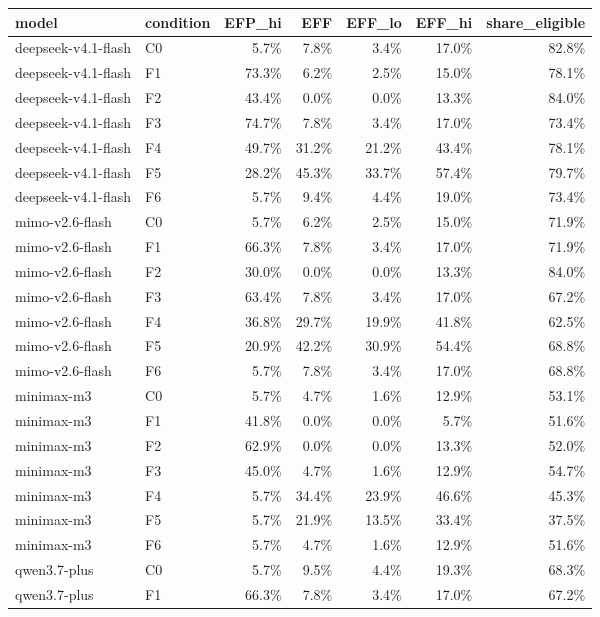 \begin{tabular}{llrrrrr}
\toprule
model & condition & EFP\_hi & EFF & EFF\_lo & EFF\_hi & share\_eligible \\
\midrule
deepseek-v4.1-flash & C0 & 5.7\% & 7.8\% & 3.4\% & 17.0\% & 82.8\% \\
deepseek-v4.1-flash & F1 & 73.3\% & 6.2\% & 2.5\% & 15.0\% & 78.1\% \\
deepseek-v4.1-flash & F2 & 43.4\% & 0.0\% & 0.0\% & 13.3\% & 84.0\% \\
deepseek-v4.1-flash & F3 & 74.7\% & 7.8\% & 3.4\% & 17.0\% & 73.4\% \\
deepseek-v4.1-flash & F4 & 49.7\% & 31.2\% & 21.2\% & 43.4\% & 78.1\% \\
deepseek-v4.1-flash & F5 & 28.2\% & 45.3\% & 33.7\% & 57.4\% & 79.7\% \\
deepseek-v4.1-flash & F6 & 5.7\% & 9.4\% & 4.4\% & 19.0\% & 73.4\% \\
mimo-v2.6-flash & C0 & 5.7\% & 6.2\% & 2.5\% & 15.0\% & 71.9\% \\
mimo-v2.6-flash & F1 & 66.3\% & 7.8\% & 3.4\% & 17.0\% & 71.9\% \\
mimo-v2.6-flash & F2 & 30.0\% & 0.0\% & 0.0\% & 13.3\% & 84.0\% \\
mimo-v2.6-flash & F3 & 63.4\% & 7.8\% & 3.4\% & 17.0\% & 67.2\% \\
mimo-v2.6-flash & F4 & 36.8\% & 29.7\% & 19.9\% & 41.8\% & 62.5\% \\
mimo-v2.6-flash & F5 & 20.9\% & 42.2\% & 30.9\% & 54.4\% & 68.8\% \\
mimo-v2.6-flash & F6 & 5.7\% & 7.8\% & 3.4\% & 17.0\% & 68.8\% \\
minimax-m3 & C0 & 5.7\% & 4.7\% & 1.6\% & 12.9\% & 53.1\% \\
minimax-m3 & F1 & 41.8\% & 0.0\% & 0.0\% & 5.7\% & 51.6\% \\
minimax-m3 & F2 & 62.9\% & 0.0\% & 0.0\% & 13.3\% & 52.0\% \\
minimax-m3 & F3 & 45.0\% & 4.7\% & 1.6\% & 12.9\% & 54.7\% \\
minimax-m3 & F4 & 5.7\% & 34.4\% & 23.9\% & 46.6\% & 45.3\% \\
minimax-m3 & F5 & 5.7\% & 21.9\% & 13.5\% & 33.4\% & 37.5\% \\
minimax-m3 & F6 & 5.7\% & 4.7\% & 1.6\% & 12.9\% & 51.6\% \\
qwen3.7-plus & C0 & 5.7\% & 9.5\% & 4.4\% & 19.3\% & 68.3\% \\
qwen3.7-plus & F1 & 66.3\% & 7.8\% & 3.4\% & 17.0\% & 67.2\% \\

\end{tabular}
